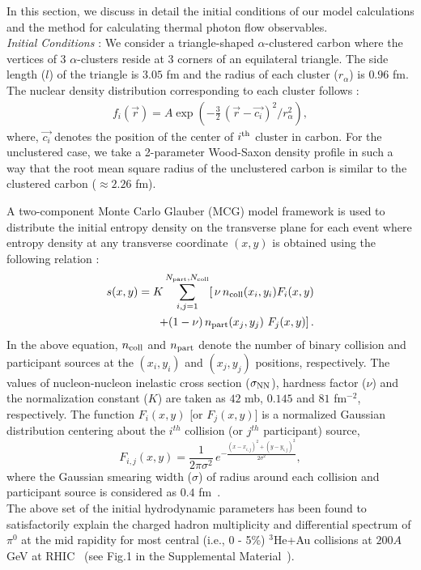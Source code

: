 \documentclass[aps,prc,twocolumn,floatfix,12pts,superscriptaddress]{revtex4}
\begin{document}
{{{In this section, we discuss in detail the initial conditions of our model calculations and the method for calculating thermal photon flow observables. \\

{\it Initial Conditions} : We consider a triangle-shaped $\alpha$-clustered carbon where the vertices of 3 $\alpha$-clusters reside at 3 corners of an equilateral triangle. The side length ($l$) of the triangle is $3.05$ fm  and the radius of each cluster ($r_\alpha$) is  $0.96$ fm. The nuclear density distribution corresponding to each cluster follows  :
	\begin{eqnarray}
		f_i(\vec{r})=A \exp \left (- \frac{3}{2} \, (\vec{r}-\vec{c_i})^2/r_\alpha^2 
		\right ), 
		\label{alpha_dist}
	\end{eqnarray}
	where, $\vec{c_i}$ denotes the position of the center of $i^{\rm th}$ cluster in carbon. For the unclustered case, we take a 2-parameter Wood-Saxon density profile in such a way that the root mean square radius of the unclustered carbon is similar to the clustered carbon ($\approx 2.26$ fm). 
	
	A two-component Monte Carlo Glauber (MCG) model framework is used to distribute the initial entropy density on the transverse  plane  for each event where entropy density at any transverse coordinate $(x,y)$ is obtained using the following relation :
	\begin{eqnarray}
		s(x,y)=K\sum_{i,j=1}^{N_{\rm part},N_{\rm coll}} [  \, \nu \, n_{\text{coll}}(x_i,y_i) F_{i}(x,y)
		\nonumber \\ +(1-\nu)\, n_{\text{part}}(x_j,y_j)\ F_{j}(x,y) ] \, .
		\label{imple_eqn}
	\end{eqnarray}
	In the above equation,  $n_{\rm coll}$ and $n_{\rm part}$  denote the number of  binary collision and participant sources at the $(x_i,y_i)$ and $(x_j,y_j)$ positions, respectively. The  values of nucleon-nucleon inelastic cross section ($\rm \sigma_{NN}$),  hardness factor ($\nu$) and the normalization constant ($K$) are taken as $42$ mb, $0.145$ and $81$ fm$^{-2}$, respectively. The function $F_{i}(x,y)$ [or $F_{j}(x,y)$] is a normalized Gaussian distribution centering about the $i^{th}$ collision (or $j^{th}$ participant) source, 
		\begin{equation}
			\label{normal_dist_eq}
			F_{i,j}(x,y)=\frac{1}{2\pi \sigma ^2}\, e^{ -\frac{(x-x_{i,j})^2+(y-y_{i,j})^2}{2\sigma ^2}},
		\end{equation}
		where the Gaussian smearing width ($\sigma$) of radius around each collision and participant source is considered as $0.4$ fm~\cite{Dasgupta:2020orj}. \\
	 The above set of the initial hydrodynamic parameters has been found to satisfactorily explain the charged hadron multiplicity and differential spectrum of $\pi^0$ at the mid rapidity for most central (i.e., 0 - 5\%) $^3$He+Au collisions at $200A$ GeV at RHIC~\cite{PHENIX:2021dod} 	(see Fig.1 in the Supplemental Material~\cite{supplemental}).
		
}}}
\end{document}
